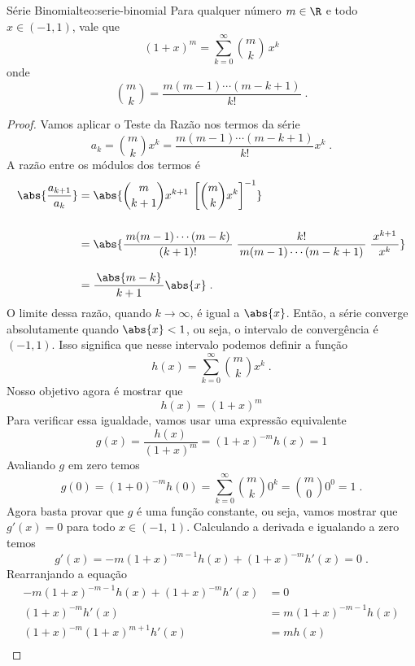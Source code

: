 \begin{teorema}{Série Binomial}{teo:serie-binomial}
  Para qualquer número $m\in\R$ e todo $x\in(-1, 1)$, vale que
  \[
    (1+x)^m = \sum_{k=0}^\infty \binom{m}{k} \, x^k
  \]
  onde
  \[
    \binom{m}{k} = \frac{m(m-1)\cdots(m-k+1)}{k!}    \;.
  \]
\end{teorema}
\begin{proof}
  Vamos aplicar o Teste da Razão nos termos da série
  \[
    a_k = \binom{m}{k} x^k = \frac{m(m-1)\cdots(m-k+1)}{k!} x^k  \;.
  \]
  A razão entre os módulos dos termos é
  \begin{align*}
    \abs{ \frac{a_{k+1}}{a_k} }
    & = \abs{  \binom{m}{k+1} x^{k+1}                    \;
        \left[ \binom{m}{k}   x^k \right]^{-1} }         \\[5mm]
    & = \abs{ \frac    {\,m(m-1)\cdots(m-k)  \,}{(k+1)!} \;
              \frac{k!}{\,m(m-1)\cdots(m-k+1)\,}         \;
              \frac{\,x^{k+1}\,}{x^k} }                  \\[3mm]
    & = \frac{\,\abs{m-k}\,}{k+1} \abs{x}  \;.
  \end{align*}
  O limite dessa razão, quando $k\to\infty$, é igual a $\abs{x}$.
  Então, a série converge absolutamente quando $\abs{x}<1$,
  ou seja, o intervalo de convergência é $(-1, 1)$.
  Isso significa que nesse intervalo podemos definir a função
  \[
    h(x) = \sum_{k=0}^\infty \binom{m}{k} x^k  \;.
  \]
  Nosso objetivo agora é mostrar que
  \[
    h(x) = (1+x)^m
  \]
  Para verificar essa igualdade, vamos usar uma expressão equivalente
  \[
    g(x) = \frac{h(x)}{(1+x)^{m}} = (1+x)^{-m}h(x) = 1
  \]
  Avaliando $g$ em zero temos
  \[
    g(0)
    = (1+0)^{-m}h(0)
    = \sum_{k=0}^\infty \binom{m}{k} 0^k
    = \binom{m}{0} 0^0
    = 1   \;.
  \]
  Agora basta provar que $g$ é uma função constante,
  ou seja, vamos mostrar que $g'(x)=0$ para todo $x\in (-1,\,1)$.
  Calculando a derivada e igualando a zero temos
  \[
    g'(x) = -m(1+x)^{-m-1} h(x) + (1+x)^{-m} h'(x) = 0  \;.
  \]
  Rearranjando a equação
  \begin{align*}
    -m(1+x)^{-m-1} h(x) + (1+x)^{-m} h'(x) & = 0                  \\
    (1+x)^{-m} h'(x)                       & = m(1+x)^{-m-1} h(x) \\
    (1+x)^{-m} (1+x)^{m+1} h'(x)           & = m h(x)             \\

\end{align*}
\end{proof}
